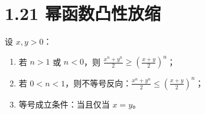 \documentclass{article}
\begin{document}
\section*{1.21 幂函数凸性放缩}
设 \( x,y>0 \)：
\begin{enumerate}
    \item 若 \( n>1 \) 或 \( n<0 \)，则 \( \frac{x^n+y^n}{2} \geq \left(\frac{x+y}{2}\right)^n \)；
    \item 若 \( 0<n<1 \)，则不等号反向：\( \frac{x^n+y^n}{2} \leq \left(\frac{x+y}{2}\right)^n \)；
    \item 等号成立条件：当且仅当 \( x=y \)。
\end{enumerate}
\end{document}
